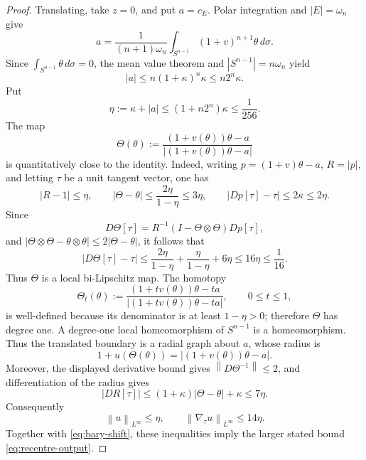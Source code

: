\documentclass[11pt]{amsart}
\theoremstyle{definition}
\newcommand{\norm}[1]{\left\|#1\right\|}
\begin{document}
\begin{proof}
Translating, take \(z=0\), and put \(a=c_E\).  Polar integration and
\(|E|=\omega_n\) give
\[
   a=\frac{1}{(n+1)\omega_n}
      \int_{S^{n-1}}(1+v)^{n+1}\theta\,d\sigma.
\]
Since \(\int_{S^{n-1}}\theta\,d\sigma=0\), the mean value theorem and
\(|S^{n-1}|=n\omega_n\) yield
\[
   |a|
   \le n(1+\kappa)^n\kappa
   \le n2^n\kappa.
\tag{4.89}\label{eq:bary-shift}
\]
Put
\[
   \eta:=\kappa+|a|
      \le(1+n2^n)\kappa\le\frac1{256}.
\]
The map
\[
   \Theta(\theta):=
   \frac{(1+v(\theta))\theta-a}
        {|(1+v(\theta))\theta-a|}
\]
is quantitatively close to the identity.  Indeed, writing
\(p=(1+v)\theta-a\), \(R=|p|\), and letting \(\tau\) be a unit tangent
vector, one has
\[
   |R-1|\le\eta,\qquad
   |\Theta-\theta|\le\frac{2\eta}{1-\eta}\le3\eta,\qquad
   |Dp[\tau]-\tau|\le2\kappa\le2\eta.
\]
Since
\[
   D\Theta[\tau]
      =R^{-1}(I-\Theta\otimes\Theta)Dp[\tau],
\]
and \(|\Theta\otimes\Theta-\theta\otimes\theta|
\le2|\Theta-\theta|\), it follows that
\[
   |D\Theta[\tau]-\tau|
   \le\frac{2\eta}{1-\eta}
       +\frac{\eta}{1-\eta}+6\eta
   \le16\eta\le\frac1{16}.
\]
Thus \(\Theta\) is a local bi-Lipschitz map.  The homotopy
\[
   \Theta_t(\theta):=
   \frac{(1+t v(\theta))\theta-ta}
        {|(1+t v(\theta))\theta-ta|},
   \qquad 0\le t\le1,
\]
is well-defined because its denominator is at least \(1-\eta>0\);
therefore \(\Theta\) has degree one.  A degree-one local
homeomorphism of \(S^{n-1}\) is a homeomorphism.  Thus the translated
boundary is a radial graph about \(a\), whose radius is
\[
   1+u(\Theta(\theta))
      =|(1+v(\theta))\theta-a|.
\]
Moreover, the displayed derivative bound gives
\(\norm{D\Theta^{-1}}\le2\), and differentiation of the radius gives
\[
   |D R[\tau]|
      \le (1+\kappa)|\Theta-\theta|+\kappa
      \le7\eta.
\]
Consequently
\[
   \norm{u}_{L^\infty}
      \le\eta,
   \qquad
   \norm{\nabla_\tau u}_{L^\infty}
      \le14\eta.
\]
Together with \eqref{eq:bary-shift}, these inequalities imply the
larger stated bound \eqref{eq:recentre-output}.
\end{proof}
\end{document}
